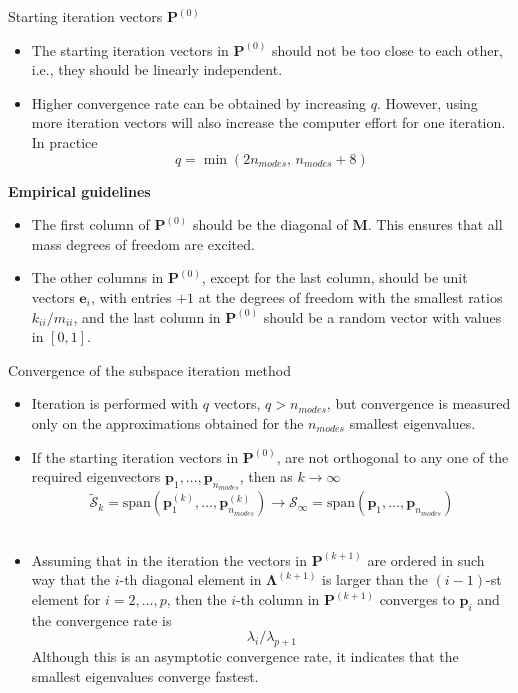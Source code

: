 \documentclass[aspectratio=169]{beamer}
\begin{document}
{\begin{frame}{Starting iteration vectors $\mathbf P^{(0)}$}
  \begin{itemize}
    \item The starting iteration vectors in $\mathbf P^{(0)}$ should not be too close to each other, i.e., they should be linearly independent.
    \item Higher convergence rate can be obtained by increasing $q$. However, using more iteration vectors will also increase the computer effort for one iteration. In practice
          $$q=\min(2n_{modes},\, n_{modes} + 8)$$
  \end{itemize}
  \begin{tcolorbox}[colback=darkred!10,colframe=darkred!40!black]
    \textbf{Empirical guidelines}
    \begin{itemize}
      \item The first column of $\mathbf P^{(0)}$ should be the diagonal of $\mathbf M$. This ensures that all mass degrees of freedom are excited.
      \item The other columns in $\mathbf P^{(0)}$, except for the last column, should be unit vectors $\mathbf e_i$, with entries $+1$ at the degrees of freedom with the smallest ratios $k_{ii}/m_{ii}$, and the last column in $\mathbf P^{(0)}$ should be a random vector with values in $[0,1]$.
    \end{itemize}
  \end{tcolorbox}
\end{frame}

\begin{frame}{Convergence of the subspace iteration method}
  \begin{itemize}
    \item Iteration is performed with $q$ vectors, $q > n_{modes}$, but convergence is measured only on the approximations obtained for the $n_{modes}$ smallest eigenvalues.
    \item If the starting iteration vectors in $\mathbf P^{(0)}$, are not orthogonal to any one of the required eigenvectors $\mathbf p_1,\dots, \mathbf p_{n_{modes}}$, then as $k\to \infty$
          $$\tilde{\mathcal S}_k=\text{span}(\mathbf p^{(k)}_1, \dots, \mathbf p^{(k)}_{n_{modes}})\to \mathcal S_\infty = \text{span}(\mathbf p_1, \dots, \mathbf p_{n_{modes}})$$\
    \item  Assuming that in the iteration
          the vectors in $\mathbf P^{(k+1)}$ are ordered in such way that the $i$-th diagonal element in $\mathbf \Lambda^{(k+1)}$ is larger
          than the $(i - 1)$-st element for $i = 2,\dots, p$, then the $i$-th column in $\mathbf P^{(k+1)}$ converges to $\mathbf p_i$ and the convergence rate is
          $$\lambda_i/\lambda_{p+1}$$
          Although this is an asymptotic convergence rate, it indicates that the smallest eigenvalues converge fastest.
  \end{itemize}
\end{frame}

}
\end{document}

